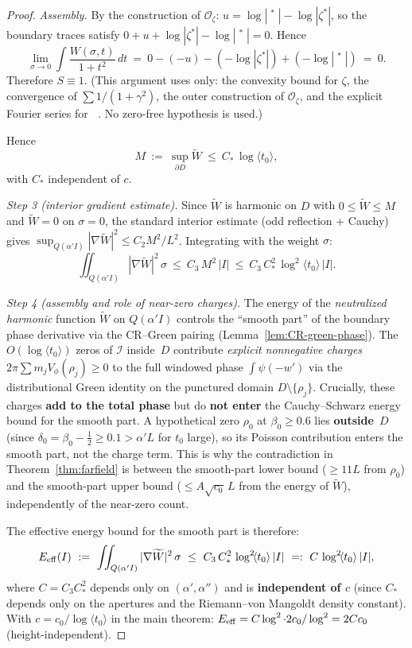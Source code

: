 \documentclass[11pt]{amsart}
\theoremstyle{definition}
\theoremstyle{remark}
\DeclareMathOperator{\dettwo}{det_2}
\newcommand{\angles}[1]{\langle #1\rangle}
\begin{document}
{\begin{proof}
\emph{Assembly.}
By the construction of \(\mathcal O_\zeta\):
\(u=\log|\dettwo^*|-\log|\zeta^*|\), so the boundary traces satisfy
\(0+u+\log|\zeta^*|-\log|\dettwo^*|=0\).
Hence
\[
  \lim_{\sigma\to 0}\int\frac{W(\sigma,t)}{1+t^2}\,dt
  \ =\ 0-(- u)-(- \log|\zeta^*|)+(- \log|\dettwo^*|)
  \ =\ 0.
\]
Therefore \(S\equiv 1\).
(This argument uses only: the convexity bound for \(\zeta\),
the convergence of \(\sum 1/(1+\gamma^2)\), the outer construction of \(\mathcal O_\zeta\),
and the explicit Fourier series for \(\dettwo\). No zero-free hypothesis is used.)

Hence
\[
  M\ :=\ \sup_{\partial D}\widetilde W\ \le\ C_*\,\log\angles{t_0},
\]
with \(C_*\) independent of \(c\).

\medskip\noindent\emph{Step 3 (interior gradient estimate).}
Since \(\widetilde W\) is harmonic on \(D\) with \(0\le\widetilde W\le M\)
and \(\widetilde W=0\) on \(\sigma=0\),
the standard interior estimate (odd reflection + Cauchy) gives
\(\sup_{Q(\alpha'I)}|\nabla\widetilde W|^2\le C_2 M^2/L^2\).
Integrating with the weight \(\sigma\):
\[
  \iint_{Q(\alpha'I)}|\nabla\widetilde W|^2\,\sigma
  \ \le\ C_3\,M^2\,|I|
  \ \le\ C_3\,C_*^2\,\log^2\!\angles{t_0}\,|I|.
\]

\medskip\noindent\emph{Step 4 (assembly and role of near-zero charges).}
The energy of the \emph{neutralized harmonic} function \(\widetilde W\) on \(Q(\alpha'I)\)
controls the ``smooth part'' of the boundary phase derivative via the CR--Green pairing
(Lemma~\ref{lem:CR-green-phase}).
The \(O(\log\angles{t_0})\) zeros of \(\mathcal I\) inside~\(D\) contribute
\emph{explicit nonnegative charges} \(2\pi\sum m_j V_\phi(\rho_j)\ge 0\)
to the full windowed phase \(\int\psi(-w')\) via the distributional Green identity
on the punctured domain \(D\setminus\{\rho_j\}\).
Crucially, these charges \textbf{add to the total phase} but do \textbf{not enter}
the Cauchy--Schwarz energy bound for the smooth part.
A hypothetical zero \(\rho_0\) at \(\beta_0\ge 0.6\) lies \textbf{outside}~\(D\)
(since \(\delta_0=\beta_0-\tfrac12\ge 0.1>\alpha'L\) for \(t_0\) large),
so its Poisson contribution enters the smooth part, not the charge term.
This is why the contradiction in Theorem~\ref{thm:farfield} is between
the smooth-part lower bound (\(\ge 11L\) from \(\rho_0\)) and the
smooth-part upper bound (\(\le A\sqrt{c_0}\,L\) from the energy of \(\widetilde W\)),
independently of the near-zero count.

The effective energy bound for the smooth part is therefore:
\[
  E_{\rm eff}(I)\ :=\ \iint_{Q(\alpha'I)}|\nabla\widetilde W|^2\,\sigma
  \ \le\ C_3\,C_*^2\,\log^2\!\angles{t_0}\,|I|
  \ =:\ C\,\log^2\!\angles{t_0}\,|I|,
\]
where \(C=C_3C_*^2\) depends only on \((\alpha',\alpha'')\) and is
\textbf{independent of \(c\)} (since \(C_*\) depends only on the apertures
and the Riemann--von Mangoldt density constant).
With \(c=c_0/\log\angles{t_0}\) in the main theorem:
\(E_{\rm eff}=C\log^2\cdot 2c_0/\log^2=2Cc_0\) (height-independent).
\end{proof}
}%
\end{document}
